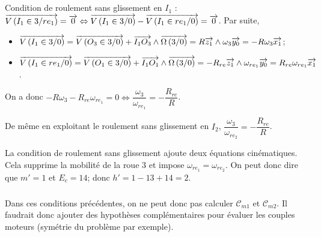 \documentclass[10pt,fleqn]{article} %
\begin{document}
%

\subparagraph{}
Condition de roulement sans glissement en $I_1$ : $\overrightarrow{V\left( {I_1} \in {3}/{re_1}\right)} = \overrightarrow{0} \Leftrightarrow \overrightarrow{V\left( {I_1} \in {3}/{0}\right)}-\overrightarrow{V\left( {I_1} \in {re_1}/{0}\right)} = \overrightarrow{0}$. Par suite, 
\begin{itemize}
\item $\overrightarrow{V\left( {I_1} \in {3}/{0}\right)}=\overrightarrow{V\left( {O_3} \in {3}/{0}\right)}+\overrightarrow{I_1 O_3}\wedge \overrightarrow{\Omega\left( {3}/{0}\right)} = R\overrightarrow{z_1} \wedge \omega_3\overrightarrow{y_0}=-R\omega_3 \overrightarrow{x_1}$;
\item $\overrightarrow{V\left( {I_1} \in {re_1}/{0}\right)}=\overrightarrow{V\left( {O_1} \in {3}/{0}\right)}+\overrightarrow{I_1 O_1}\wedge \overrightarrow{\Omega\left( {3}/{0}\right)} = -R_{re}\overrightarrow{z_1} \wedge \omega_{re_1}\overrightarrow{y_0}=R_{re}\omega_{re_1} \overrightarrow{x_1}$.
\end{itemize}
On a donc $-R\omega_3 -R_{re}\omega_{re_1} =0 \Leftrightarrow\dfrac{\omega_3}{\omega_{re_1}}=-\dfrac{R_{re}}{R} $.

De même en exploitant le roulement sans glissement en $I_2$, $\dfrac{\omega_3}{\omega_{re_2}}=-\dfrac{R_{re}}{R} $. 

La condition de roulement sans glissement ajoute deux équations cinématiques. Cela supprime la mobilité de la roue 3 et impose $\omega_{re_1}=\omega_{re_2}$. 
On peut donc dire que $m'=1$ et $E_c=14$; donc $h'=1-13+14=2$. 

\subparagraph{}
Dans ces conditions précédentes, on ne peut donc pas calculer $\mathcal{C}_{m1}$ et $\mathcal{C}_{m2}$. Il faudrait donc ajouter des hypothèses complémentaires pour évaluer les couples moteurs (symétrie du problème par exemple). 

\end{document}
